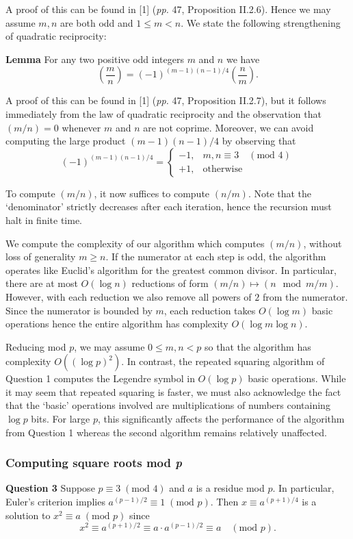 \documentclass[12pt]{article}
\newcommand{\textmod}[1]{\;(\text{mod }#1)}
\newcommand{\mathmod}[1]{\quad(\text{mod }#1)}
\begin{document}
A proof of this can be found in [1] (\textit{pp.} 47, Proposition
II.2.6). Hence we may assume \(m,n\) are both odd and \(1\leq m<n\). We state the following strengthening of quadratic reciprocity: 

\textbf{Lemma} For any two positive odd integers \(m\) and \(n\) we have
\[\left(\frac{m}{n}\right) = (-1)^{(m-1)(n-1)/4}\left(\frac{n}{m}\right).\]

A proof of this can be found in [1] (\textit{pp.} 47, Proposition
II.2.7), but it follows immediately from the law of quadratic reciprocity and
the observation that \((m/n)=0\) whenever \(m\) and \(n\) are not coprime.
Moreover, we can avoid computing the large product \((m-1)(n-1)/4\) by observing
that 
\[(-1)^{(m-1)(n-1)/4} = \begin{cases}
    -1, & m,n\equiv 3 \quad(\text{mod }4) \\
    +1, &\text{otherwise}
\end{cases}\] 

To compute \((m/n)\), it now suffices to compute \((n/m)\). Note that the
`denominator' strictly decreases after each iteration, hence the recursion must
halt in finite time.

We compute the complexity of our algorithm which computes \((m/n)\), without
loss of generality \(m\geq n\). If the numerator at each step is odd, the
algorithm operates like Euclid's algorithm for the greatest common divisor. In
particular, there are at most \(O(\log n)\) reductions of form \((m/n)\mapsto (n
\mod m / m)\). However, with each reduction we also remove all powers of \(2\)
from the numerator. Since the numerator is bounded by \(m\), each reduction
takes \(O(\log m)\) basic operations hence the entire algorithm has complexity
\(O(\log m \log n)\).

Reducing mod \(p\), we may assume \(0\leq m,n < p\) so that the algorithm has
complexity \(O((\log p)^2)\). In contrast, the repeated squaring algorithm of
Question 1 computes the Legendre symbol in \(O(\log p)\) basic operations. While
it may seem that repeated squaring is faster, we must also acknowledge the
fact that the `basic' operations involved are multiplications of numbers
containing \(\log p\) bits. For large \(p\), this significantly affects the
performance of the algorithm from Question 1 whereas the second algorithm
remains relatively unaffected.

\subsubsection{Computing square roots mod \textit{p}}
\textbf{Question 3}\quad 
Suppose \(p\equiv 3\;(\text{mod }4)\) and \(a\) is a residue mod \(p\). In
particular, Euler's criterion implies \(a^{(p-1)/2}\equiv 1\textmod{p}\). Then \(x\equiv
a^{(p+1)/4}\) is a solution to \(x^2\equiv a\textmod{p}\) since
\[x^2 \equiv a^{(p+1)/2} \equiv a\cdot a^{(p-1)/2} \equiv a \mathmod{p}.\]
\end{document}
